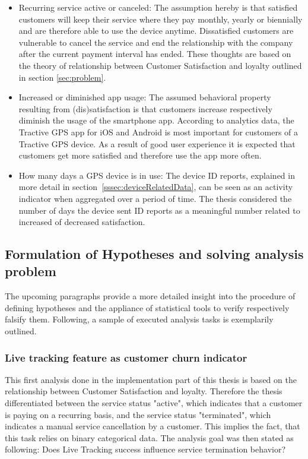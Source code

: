 \begin{itemize}
	\item Recurring service active or canceled: The assumption hereby is that satisfied customers will keep their service where they pay monthly, yearly or biennially and are therefore able to use the device anytime. Dissatisfied customers are vulnerable to cancel the service and end the relationship with the company after the current payment interval has ended. These thoughts are based on the theory of relationship between Customer Satisfaction and loyalty outlined in section \ref{sec:problem}.
	\item Increased or diminished app usage: The assumed behavioral property resulting from (dis)satisfaction is that customers increase respectively diminish the usage of the smartphone app. According to analytics data, the Tractive GPS app for iOS and Android is most important for customers of a Tractive GPS device. As a result of good user experience it is expected that customers get more satisfied and therefore use the app more often.
	\item How many days a GPS device is in use: The device ID reports, explained in more detail in section~\ref{sssec:deviceRelatedData}, can be seen as an activity indicator when aggregated over a period of time. The thesis considered the number of days the device sent ID reports as a meaningful number related to increased of decreased satisfaction.
\end{itemize}

\subsection{Formulation of Hypotheses and solving analysis problem}
The upcoming paragraphs provide a more detailed insight into the procedure of defining hypotheses and the appliance of statistical tools to verify respectively falsify them. Following, a sample of executed analysis tasks is exemplarily outlined. 

\subsubsection{Live tracking feature as customer churn indicator}
This first analysis done in the implementation part of this thesis is based on the relationship between Customer Satisfaction and loyalty. Therefore the thesis differentiated between the service status "active", which indicates that a customer is paying on a recurring basis, and the service status "terminated", which indicates a manual service cancellation by a customer. This implies the fact, that this task relies on binary categorical data. The analysis goal was then stated as following: Does Live Tracking success influence service termination behavior?

